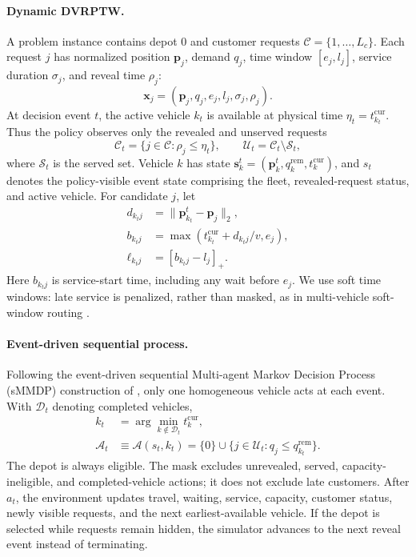\documentclass[letterpaper]{article}
\begin{document}
\paragraph{Dynamic DVRPTW.}
A problem instance contains depot $0$ and customer requests $\mathcal C=\{1,\ldots,L_c\}$. Each request $j$ has normalized position $\mathbf p_j$, demand $q_j$, time window $[e_j,l_j]$, service duration $\sigma_j$, and reveal time $\rho_j$:
\[
\mathbf x_j=(\mathbf p_j,q_j,e_j,l_j,\sigma_j,\rho_j).
\]
At decision event $t$, the active vehicle $k_t$ is available at physical time $\eta_t=t^{\mathrm{cur}}_{k_t}$. Thus the policy observes only the revealed and unserved requests
\[
\mathcal C_t=\{j\in\mathcal C:\rho_j\leq\eta_t\},\qquad
\mathcal U_t=\mathcal C_t\setminus\mathcal S_t,
\]
where $\mathcal S_t$ is the served set. Vehicle $k$ has state $\mathbf s_k^t=(\mathbf p_k^t,q_k^{\mathrm{rem}},t_k^{\mathrm{cur}})$, and $s_t$ denotes the policy-visible event state comprising the fleet, revealed-request status, and active vehicle. For candidate $j$, let
\[
\begin{aligned}
d_{k_tj}&=\|\mathbf p_{k_t}^t-\mathbf p_j\|_2,\\
b_{k_tj}&=\max\!\left(t_{k_t}^{\mathrm{cur}}+d_{k_tj}/v,e_j\right),\\
\ell_{k_tj}&=[b_{k_tj}-l_j]_+ .
\end{aligned}
\]
Here $b_{k_tj}$ is service-start time, including any wait before $e_j$. We use soft time windows: late service is penalized, rather than masked, as in multi-vehicle soft-window routing \cite{zhang2020multi,bono2021mardam}.

\paragraph{Event-driven sequential process.}
Following the event-driven sequential Multi-agent Markov Decision Process (sMMDP) construction of \citet{bono2021mardam}, only one homogeneous vehicle acts at each event. With $\mathcal D_t$ denoting completed vehicles,
\[
\begin{aligned}
k_t&=\arg\min_{k\notin\mathcal D_t}t_k^{\mathrm{cur}},\\
\mathcal A_t&\equiv\mathcal A(s_t,k_t)=\{0\}\cup
\{j\in\mathcal U_t:q_j\leq q_{k_t}^{\mathrm{rem}}\}.
\end{aligned}
\]
The depot is always eligible. The mask excludes unrevealed, served, capacity-ineligible, and completed-vehicle actions; it does not exclude late customers. After $a_t$, the environment updates travel, waiting, service, capacity, customer status, newly visible requests, and the next earliest-available vehicle. If the depot is selected while requests remain hidden, the simulator advances to the next reveal event instead of terminating.
\end{document}

